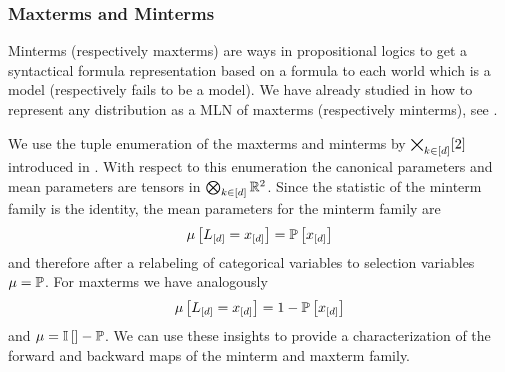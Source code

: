 \subsubsection{Maxterms and Minterms}

Minterms (respectively maxterms) are ways in propositional logics to get a syntactical formula representation based on a formula to each world which is a model (respectively fails to be a model).
We have already studied in  how to represent any distribution as a MLN of maxterms (respectively minterms), see .

We use the tuple enumeration of the maxterms and minterms by $\bigtimes_{k\in[d]}[2]$ introduced in .
With respect to this enumeration the canonical parameters and mean parameters are tensors in $\bigotimes_{k\in[d]}\mathbb{R}^2$. 
Since the statistic of the minterm family is the identity, the mean parameters for the minterm family are
	\[ \mu\left[L_{[d]}=x_{[d]}\right] 
	= \mathbb{P}\left[x_{[d]}\right] 
	\]
and therefore after a relabeling of categorical variables to selection variables $\mu=\mathbb{P}$.
For maxterms we have analogously
	\[ \mu\left[L_{[d]}=x_{[d]}\right] 
	= 1-\mathbb{P}\left[x_{[d]}\right] 
	\]
and $\mu = \mathbb{I}\left[\right]-\mathbb{P}$.
We can use these insights to provide a characterization of the forward and backward maps of the minterm and maxterm family.


